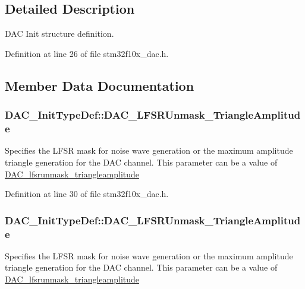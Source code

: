 \subsection{Detailed Description}
D\+AC Init structure definition. 

Definition at line 26 of file stm32f10x\+\_\+dac.\+h.



\subsection{Member Data Documentation}
\subsubsection[{\texorpdfstring{D\+A\+C\+\_\+\+L\+F\+S\+R\+Unmask\+\_\+\+Triangle\+Amplitude}{DAC_LFSRUnmask_TriangleAmplitude}}]{ D\+A\+C\+\_\+\+Init\+Type\+Def\+::\+D\+A\+C\+\_\+\+L\+F\+S\+R\+Unmask\+\_\+\+Triangle\+Amplitude}\hypertarget{struct_d_a_c___init_type_def_a018347caf971cb4dbd161550cd62f5b8}{}\label{struct_d_a_c___init_type_def_a018347caf971cb4dbd161550cd62f5b8}
Specifies the L\+F\+SR mask for noise wave generation or the maximum amplitude triangle generation for the D\+AC channel. This parameter can be a value of \hyperlink{group___d_a_c__lfsrunmask__triangleamplitude}{D\+A\+C\+\_\+lfsrunmask\+\_\+triangleamplitude} 

Definition at line 30 of file stm32f10x\+\_\+dac.\+h.

\subsubsection[{\texorpdfstring{D\+A\+C\+\_\+\+L\+F\+S\+R\+Unmask\+\_\+\+Triangle\+Amplitude}{DAC_LFSRUnmask_TriangleAmplitude}}]{ D\+A\+C\+\_\+\+Init\+Type\+Def\+::\+D\+A\+C\+\_\+\+L\+F\+S\+R\+Unmask\+\_\+\+Triangle\+Amplitude}\hypertarget{struct_d_a_c___init_type_def_a27ed27a544d50781b20d59cc55e6cef8}{}\label{struct_d_a_c___init_type_def_a27ed27a544d50781b20d59cc55e6cef8}
Specifies the L\+F\+SR mask for noise wave generation or the maximum amplitude triangle generation for the D\+AC channel. This parameter can be a value of \hyperlink{group___d_a_c__lfsrunmask__triangleamplitude}{D\+A\+C\+\_\+lfsrunmask\+\_\+triangleamplitude} 

